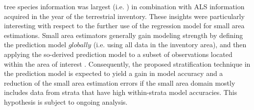 tree species information was largest (i.e. ) in combination with ALS information acquired in the year of the terrestrial inventory. These insights were particularly interesting with respect to the further use of the regression model for small area estimations. Small area estimators generally gain modeling strength by defining the prediction model $globally$ (i.e. using all data in the inventory area), and then applying the so-derived prediction model to a subset of observations located within the area of interest \citep{mandallaz2016}. Consequently, the proposed stratification technique in the prediction model is expected to yield a gain in model accuracy and a reduction of the small area estimation errors if the small area domain mostly includes data from strata that have high within-strata model accuracies. This hypothesis is subject to ongoing analysis. 






